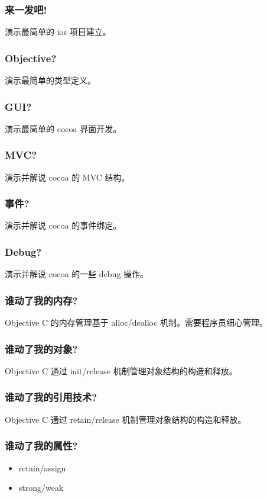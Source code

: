 \documentclass[utf8x, notes=hide]{beamer}
\begin{document}
\begin{frame}
  \frametitle{来一发吧!}
演示最简单的 ios 项目建立。
\end{frame}

\begin{frame}
  \frametitle{Objective?}
演示最简单的类型定义。
\end{frame}

\begin{frame}
  \frametitle{GUI?}
演示最简单的 cocoa 界面开发。
\end{frame}

\begin{frame}
  \frametitle{MVC?}
演示并解说 cocoa 的 MVC 结构。
\end{frame}

\begin{frame}
  \frametitle{事件?}
演示并解说 cocoa 的事件绑定。
\end{frame}

\begin{frame}
  \frametitle{Debug?}
演示并解说 cocoa 的一些 debug 操作。
\end{frame}

\begin{frame}
  \frametitle{谁动了我的内存?}
Objective C 的内存管理基于 alloc/dealloc 机制。需要程序员细心管理。
\end{frame}

\begin{frame}
  \frametitle{谁动了我的对象?}
Objective C 通过 init/release 机制管理对象结构的构造和释放。
\end{frame}

\begin{frame}
  \frametitle{谁动了我的引用技术?}
Objective C 通过 retain/release 机制管理对象结构的构造和释放。
\end{frame}

\begin{frame}
  \frametitle{谁动了我的属性?}
  \begin{itemize}
  \item retain/assign
  \item strong/weak
  \end{itemize}
\end{frame}
\end{document}
